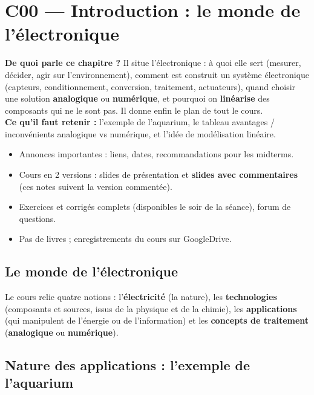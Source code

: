 \chapter{C00 --- Introduction : le monde de l'électronique}

\begin{rembox}[title=En bref]
\textbf{De quoi parle ce chapitre ?} Il situe l'électronique : à quoi elle sert (mesurer,
décider, agir sur l'environnement), comment est construit un système électronique (capteurs,
conditionnement, conversion, traitement, actuateurs), quand choisir une solution
\textbf{analogique} ou \textbf{numérique}, et pourquoi on \textbf{linéarise} des composants qui
ne le sont pas. Il donne enfin le plan de tout le cours. \\
\textbf{Ce qu'il faut retenir :} l'exemple de l'aquarium, le tableau avantages /
inconvénients analogique vs numérique, et l'idée de modélisation linéaire.
\end{rembox}

\begin{rembox}[title=Organisation du cours (Moodle)]
\begin{itemize}
  \item Annonces importantes : liens, dates, recommandations pour les midterms.
  \item Cours en 2 versions : slides de présentation et \textbf{slides avec commentaires}
        (ces notes suivent la version commentée).
  \item Exercices et corrigés complets (disponibles le soir de la séance), forum de questions.
  \item Pas de livres ; enregistrements du cours sur GoogleDrive.
\end{itemize}
\end{rembox}

\section{Le monde de l'électronique}

Le cours relie quatre notions : l'\textbf{électricité} (la nature), les \textbf{technologies}
(composants et sources, issus de la physique et de la chimie), les \textbf{applications}
(qui manipulent de l'énergie ou de l'information) et les \textbf{concepts de traitement}
(\textbf{analogique} ou \textbf{numérique}).

\section{Nature des applications : l'exemple de l'aquarium}

